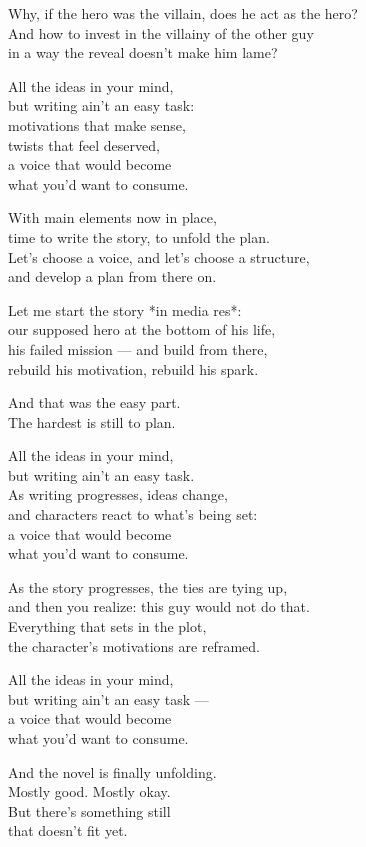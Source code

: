 \begin{lyrics}
Why, if the hero was the villain, does he act as the hero?\\
And how to invest in the villainy of the other guy\\
in a way the reveal doesn't make him lame?

All the ideas in your mind,\\
but writing ain't an easy task:\\
motivations that make sense,\\
twists that feel deserved,\\
a voice that would become\\
what you'd want to consume.

With main elements now in place,\\
time to write the story, to unfold the plan.\\
Let's choose a voice, and let's choose a structure,\\
and develop a plan from there on.

Let me start the story *in media res*:\\
our supposed hero at the bottom of his life,\\
his failed mission — and build from there,\\
rebuild his motivation, rebuild his spark.

And that was the easy part.\\
The hardest is still to plan.

All the ideas in your mind,\\
but writing ain't an easy task.\\
As writing progresses, ideas change,\\
and characters react to what's being set:\\
a voice that would become\\
what you'd want to consume.

As the story progresses, the ties are tying up,\\
and then you realize: this guy would not do that.\\
Everything that sets in the plot,\\
the character's motivations are reframed.

All the ideas in your mind,\\
but writing ain't an easy task —\\
a voice that would become\\
what you'd want to consume.

And the novel is finally unfolding.\\
Mostly good. Mostly okay.\\
But there's something still\\
that doesn't fit yet.
\end{lyrics}

